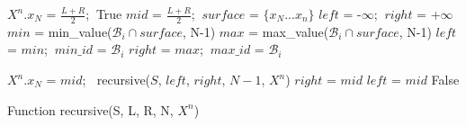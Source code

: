 \begin{algorithm}
\begin{algorithmic}[1]
\Input
\EndInput
\Output
\EndOutput
{}
    \State $X^n.x_N$ = $\frac{L+R}{2}$; $\ $\Return True
\EndIf
{}
    \State $mid$ = $\frac{L+R}{2}$; $\ surface$ = $\{x_{N}...x_{n}\}$
    \State $left$ = -$\infty$; $\ right$ = +$\infty$
        \State $min$ = min\_value($\mathcal{B}_i \cap surface$, N-1)
        \State $max$ = max\_value($\mathcal{B}_i \cap surface$, N-1)
            \State $left$ = $min$; $\ min\_id$ = $\mathcal{B}_i$
        \EndIf
            \State $right$ = $max$; $\ max\_id$ = $\mathcal{B}_i$
        \EndIf
    \EndFor
    
        \State $X^n.x_N$ = $mid$; $\ $
        \Return recursive($S$, $left$, $right$, $N-1$, $X^n$)
        \State $right$ = $mid$
    \Else
        \State $left$ = $mid$
    \EndIf
\EndWhile
\State \Return False
\end{algorithmic}
\caption{Function recursive(S, L, R, N, $X^n$)}
\label{algo:recursive}
\end{algorithm}
